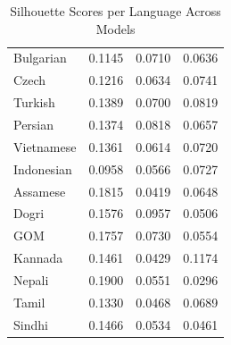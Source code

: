\documentclass[11pt]{article}
\begin{document}
\begin{table}[htbp]
\begin{tabular}{lccc}
            Bulgarian                  & 0.1145           & 0.0710        & 0.0636               \\
            Czech                      & 0.1216           & 0.0634        & 0.0741               \\
            Turkish                    & 0.1389           & 0.0700        & 0.0819               \\
            Persian                    & 0.1374           & 0.0818        & 0.0657               \\
            Vietnamese                 & 0.1361           & 0.0614        & 0.0720               \\
            Indonesian                 & 0.0958           & 0.0566        & 0.0727               \\
            Assamese                   & 0.1815           & 0.0419        & 0.0648               \\
            Dogri                      & 0.1576           & 0.0957        & 0.0506               \\
            GOM                        & 0.1757           & 0.0730        & 0.0554               \\
            Kannada                    & 0.1461           & 0.0429        & 0.1174               \\
            Nepali                     & 0.1900           & 0.0551        & 0.0296               \\
            Tamil                      & 0.1330           & 0.0468        & 0.0689               \\
            Sindhi                     & 0.1466           & 0.0534        & 0.0461               \\
            \bottomrule
        \end{tabular}
        \caption{Silhouette Scores per Language Across Models}
        \label{tab:silhouette_scores}
    \end{table}
\end{document}
